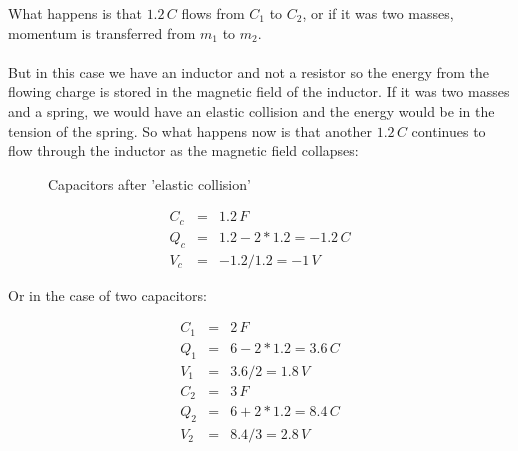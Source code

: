 \documentclass[]{../common/elementary-physics}
\begin{document}
What happens is that $1.2 \, C$ flows from $C_1$ to $C_2$, or if it was two masses, momentum is transferred from $m_1$ to $m_2$.\\
\\
But in this case we have an inductor and not a resistor so the energy from the flowing charge is stored in the magnetic field of the inductor.
If it was two masses and a spring, we would have an elastic collision and the energy would be in the tension of the spring.
So what happens now is that another $1.2 \, C$ continues to flow through the inductor as the magnetic field collapses:

\begin{figure}[ht] \centering
	\qquad
	\caption{Capacitors after 'elastic collision'}
\end{figure}

\begin{eqnarray}
C_c &=& 1.2 \, F \\
Q_c &=& 1.2 - 2*1.2 = -1.2 \, C \\
V_c &=& -1.2 / 1.2 = -1 \, V
\end{eqnarray}

Or in the case of two capacitors:

\begin{eqnarray}
C_1 &=& 2 \, F \\
Q_1 &=& 6 - 2*1.2 = 3.6 \, C \\
V_1 &=& 3.6 / 2 = 1.8 \, V \\
C_2 &=& 3 \, F \\
Q_2 &=& 6 + 2*1.2 = 8.4 \, C \\
V_2 &=& 8.4 / 3 = 2.8 \, V 
\end{eqnarray}
\end{document}
